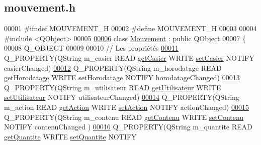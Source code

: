 \hypertarget{mouvement_8h_source}{}\subsection{mouvement.\+h}
\label{mouvement_8h_source}

\begin{DoxyCode}
00001 \textcolor{preprocessor}{#ifndef MOUVEMENT\_H}
00002 \textcolor{preprocessor}{#define MOUVEMENT\_H}
00003 
00004 \textcolor{preprocessor}{#include <QObject>}
00005 
\hyperlink{class_mouvement}{00006} \textcolor{keyword}{class }\hyperlink{class_mouvement}{Mouvement} : \textcolor{keyword}{public} QObject
00007 \{
00008     Q\_OBJECT
00009 
00010     \textcolor{comment}{// Les propriétés}
\hyperlink{class_mouvement_a186f483cf82ff2866da1e10031838567}{00011}     Q\_PROPERTY(QString m\_casier READ \hyperlink{class_mouvement_ae3ebc2911605104452a612aaf8a48e64}{getCasier} WRITE \hyperlink{class_mouvement_ad47317b7671e3b9b7e6e060f667924a7}{setCasier} NOTIFY casierChanged)
\hyperlink{class_mouvement_a24f34a74c17068f6c98635400862adcd}{00012}     Q\_PROPERTY(QString m\_horodatage READ \hyperlink{class_mouvement_ab6990fd5ea6c47ab3fb6a8a4944c2df9}{getHorodatage} WRITE 
      \hyperlink{class_mouvement_ab0bd90180d06f2ed37fb2b796f31aeb8}{setHorodatage} NOTIFY horodatageChanged)
\hyperlink{class_mouvement_adee253bf00365d1cb4c45bd58d8b3e58}{00013}     Q\_PROPERTY(QString m\_utilisateur READ \hyperlink{class_mouvement_a80c65d0cba3e7918f7112fd7f85a1471}{getUtilisateur} WRITE 
      \hyperlink{class_mouvement_abd38b265d54e55a4dd897e3270141a84}{setUtilisateur} NOTIFY utilisateurChanged)
\hyperlink{class_mouvement_af0444a7f837bdf252f2a3ccd4eb8a701}{00014}     Q\_PROPERTY(QString m\_action READ \hyperlink{class_mouvement_a683576b69fc9ab0bef8b85b1468408e2}{getAction} WRITE \hyperlink{class_mouvement_a2c64d36ea78ea6b428ddd0a0610411c1}{setAction} NOTIFY actionChanged)
\hyperlink{class_mouvement_a631b133243576c36fec6e1912415d7d6}{00015}     Q\_PROPERTY(QString m\_contenu READ \hyperlink{class_mouvement_a6a288ea183789e4b99f6f520ff7a32ab}{getContenu} WRITE \hyperlink{class_mouvement_a07e3d77c7d7af6a74e3ac5e7eb195ff9}{setContenu} NOTIFY contenuChanged
      )
\hyperlink{class_mouvement_ab6040d52ca99ef88d253b1742e70ffd3}{00016}     Q\_PROPERTY(QString m\_quantite READ \hyperlink{class_mouvement_a427e1320936bfaf09ca0b2c42ae9dd98}{getQuantite} WRITE \hyperlink{class_mouvement_aa9ed36b12cb4c46f851682d630cc28f8}{setQuantite} NOTIFY 

\end{DoxyCode}
